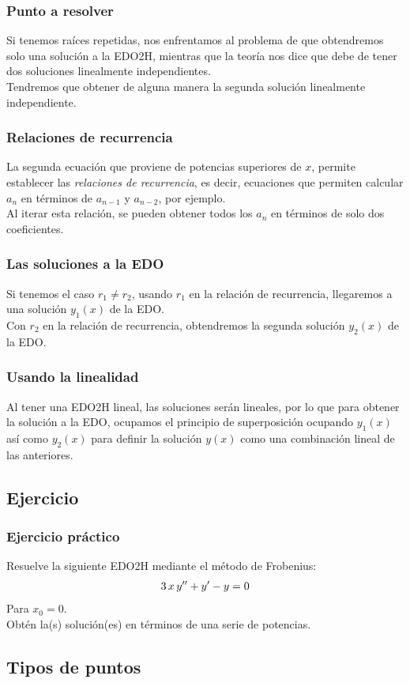 \documentclass[12pt]{beamer}
\begin{document}
\begin{frame}
\frametitle{Punto a resolver}
Si tenemos raíces repetidas, nos enfrentamos al problema de que obtendremos solo una solución a la EDO2H, mientras que la teoría nos dice que debe de tener dos soluciones linealmente independientes.
\\
\bigskip
\pause
Tendremos que obtener de alguna manera la segunda solución linealmente independiente.
\end{frame}
\begin{frame}
\frametitle{Relaciones de recurrencia}
La segunda ecuación que proviene de potencias superiores de $x$, permite establecer las \emph{relaciones de recurrencia}, es decir, ecuaciones que permiten calcular $a_{n}$ en términos de $a_{n-1}$ y $a_{n-2}$, por ejemplo.
\\
\bigskip
Al iterar esta relación, se pueden obtener todos los $a_{n}$ en términos de solo dos coeficientes.
\end{frame}
\begin{frame}
\frametitle{Las soluciones a la EDO}
Si tenemos el caso $r_{1} \neq r_{2}$, usando $r_{1}$ en la relación de recurrencia, llegaremos a una solución $y_{1}(x)$ de la EDO.
\\
\bigskip
\pause
Con $r_{2}$ en la relación de recurrencia, obtendremos la segunda solución $y_{2}(x)$ de la EDO.
\end{frame}
\begin{frame}
\frametitle{Usando la linealidad}
Al tener una EDO2H lineal, las soluciones serán lineales, por lo que para obtener la solución a la EDO, ocupamos el principio de superposición ocupando $y_{1}(x)$ así como $y_{2}(x)$ para definir la solución $y(x)$ como una combinación lineal de las anteriores.
\end{frame}
\subsection{Ejercicio}
\begin{frame}
\frametitle{Ejercicio práctico}
Resuelve la siguiente EDO2H mediante el método de Frobenius:
\begin{align}
3 \, x \, {y}^{\prime \prime} + {y}^{\prime} - y = 0
\label{eq:ecuacion_04}    
\end{align}
Para $x_{0} = 0$.
\\
\bigskip
\pause
Obtén la(s) solución(es) en términos de una serie de potencias.
\end{frame}

\subsection*{Tipos de puntos}
\end{document}
